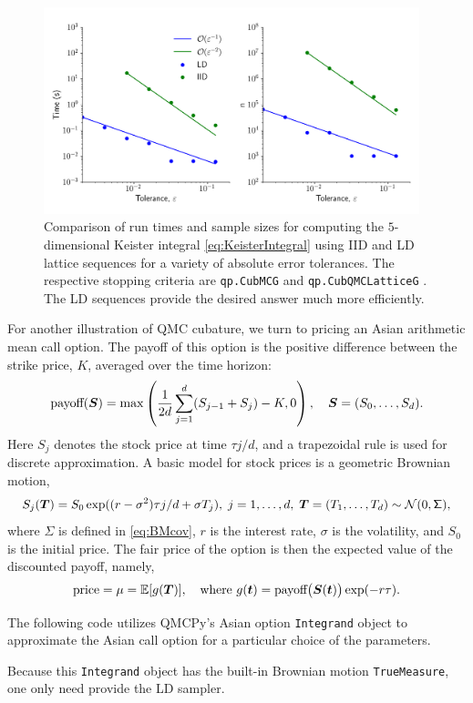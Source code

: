 \documentclass[graybox,footinfo]{svmult}
\newcommand{\mSigma}{\mathsf{\Sigma}}
\begin{document}
\begin{figure}
	\includegraphics[height=6cm]{QMCSoftwareArticle/figs/sc_comp.png}
	\caption{Comparison of run times and sample sizes for computing the $5$-dimensional Keister integral \eqref{eq:KeisterIntegral} using IID and LD lattice sequences for a variety of absolute error tolerances. The respective stopping criteria are  \texttt{qp.CubMCG} \cite{HicEtal14a} and  \texttt{qp.CubQMCLatticeG} \cite{JimHic16a}. The LD sequences provide the desired answer much more efficiently.}
	\label{fig:sc_comp}
\end{figure}

For another illustration of QMC cubature, we turn to pricing an Asian arithmetic mean call option. The payoff of this option is the positive difference between the strike price, $K$, averaged over the time horizon: 
$$
\text{payoff}({\boldsymbol{S}}) = \max\left(\frac{1}{2d}\sum_{j=1}^d (S_{j-1}+S_j)-K,0\right), \quad {\boldsymbol{S}} = (S_0, \ldots, S_d).
$$
Here $S_j$ denotes the stock price at time $\tau j/d$, and a trapezoidal rule is used for discrete approximation.  A basic model for stock prices is a geometric Brownian motion, 
\[
S_j(\bsT) = S_0 \exp((r - \sigma^2) \tau j/d + \sigma T_j),   \;  j = 1, \ldots, d, \; \bsT = (T_1, \ldots, T_d)\sim \calN(0,\mSigma),
\]
where $\mSigma$ is defined in \eqref{eq:BMcov}, $r$ is the interest rate, $\sigma$ is the volatility, and $S_0$ is the initial price.  The fair price of the option is then the expected value of the discounted payoff, namely,
\begin{equation*}
	\text{price} = \mu = {\mathbb{E}}[g({\boldsymbol{T}})], \quad \text{where } g({\boldsymbol{t}}) = \text{payoff}\bigl({\boldsymbol{S}}({\boldsymbol{t}}) \bigr) \exp(-r \tau).
\end{equation*}

The following code utilizes QMCPy's Asian option \texttt{Integrand} object to approximate the Asian call option for a particular choice of the parameters.

Because this \texttt{Integrand} object has the built-in Brownian motion \texttt{TrueMeasure}, one only need provide the LD sampler.
\end{document}

